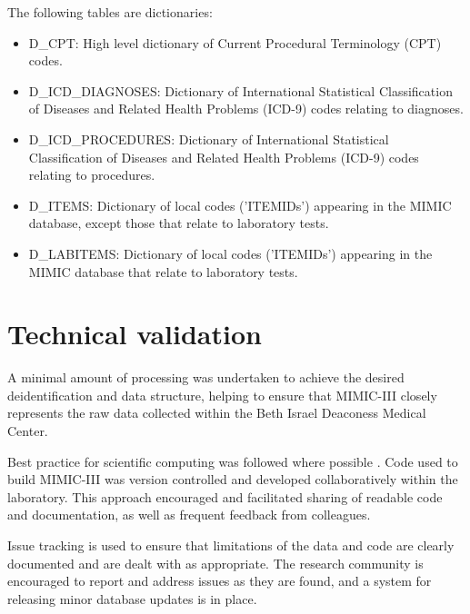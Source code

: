 \documentclass[english]{article}
\begin{document}
The following tables are dictionaries:

\begin{itemize}
  \item D\_CPT: High level dictionary of Current Procedural Terminology (CPT) codes.
  \item D\_ICD\_DIAGNOSES: Dictionary of International Statistical Classification of Diseases and Related Health Problems (ICD-9) codes relating to diagnoses.
  \item D\_ICD\_PROCEDURES: Dictionary of International Statistical Classification of Diseases and Related Health Problems (ICD-9) codes relating to procedures.
  \item D\_ITEMS: Dictionary of local codes ('ITEMIDs') appearing in the MIMIC database, except those that relate to laboratory tests.
  \item D\_LABITEMS: Dictionary of local codes ('ITEMIDs') appearing in the MIMIC database that relate to laboratory tests.
\end{itemize}


\section*{Technical validation}


A minimal amount of processing was undertaken to achieve the desired deidentification and data structure, helping to ensure that MIMIC-III closely represents the raw data collected within the Beth Israel Deaconess Medical Center.

Best practice for scientific computing was followed where possible \cite{cite4}. Code used to build MIMIC-III was version controlled and developed collaboratively within the laboratory. This approach encouraged and facilitated sharing of readable code and documentation, as well as frequent feedback from colleagues.

Issue tracking is used to ensure that limitations of the data and code are clearly documented and are dealt with as appropriate. The research community is encouraged to report and address issues as they are found, and a system for releasing minor database updates is in place.
\end{document}
